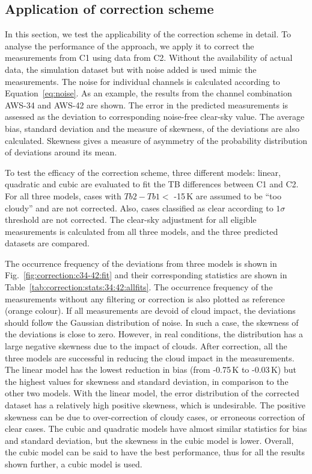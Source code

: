 \documentclass[12pt]{article}
\begin{document}
\subsection{Application of correction scheme}
%
In this section, we test the applicability of the correction scheme in detail.
To analyse the performance of the approach, we apply it to correct the
measurements from C1 using data from C2. Without the availability of actual
data, the simulation dataset but with noise added is used mimic the measurements. The
noise for individual channels is calculated according to
Equation~\ref{eq:noise}. As an example, the results from the channel
combination AWS-34 and AWS-42 are shown. The error in the
predicted measurements is assessed as the deviation to corresponding noise-free
clear-sky value. The average bias, standard deviation and the measure of skewness, of the deviations are also calculated. Skewness gives a measure of asymmetry of the probability distribution of deviations around its mean.

To test the efficacy of the correction scheme, three different models: linear,
quadratic and cubic are evaluated to fit the TB differences between C1 and C2.
For all three models, cases with $Tb2-Tb1 < $ -15\,K are assumed to be ``too
cloudy'' and are not corrected. Also, cases classified as clear according to $1\sigma$ threshold are not corrected. The clear-sky adjustment for all eligible
measurements is calculated from all three
models, and the three predicted datasets are compared.

The occurrence frequency of the deviations from three models is shown in
Fig.~\ref{fig:correction:c34-42:fit} and their corresponding statistics are shown in Table~\ref{tab:correction:stats:34:42:allfits}. The occurrence frequency of the
measurements without any filtering or correction is also plotted as reference
(orange colour). If all measurements are devoid of cloud impact, the
deviations should follow the Gaussian distribution of noise. In such a case, the skewness of the deviations is close to zero.  However, in real conditions, the distribution has a large negative skewness due to the impact of clouds. After correction, all the three models are successful in reducing the cloud impact in the
measurements. The linear model has the lowest reduction in bias (from  -0.75\,K to -0.03\,K) but the highest values for skewness and standard deviation, in comparison to the other two models.  With the linear model, the error distribution of the corrected dataset has a relatively high positive skewness, which is undesirable. The positive skewness can be due to over-correction of cloudy cases, or erroneous correction of clear cases. The cubic  and quadratic models have almost similar statistics for bias and standard deviation, but the skewness in the cubic model is lower. Overall, the cubic model can be said to have the best performance, thus for all the results shown further, a cubic model is used.
\end{document}
